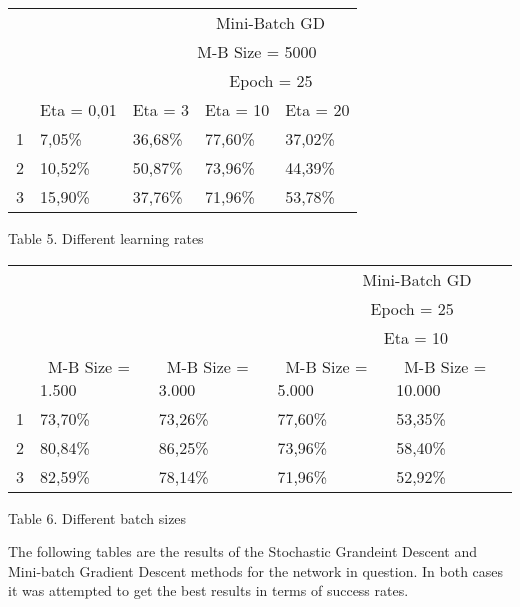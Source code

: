 \documentclass[a4paper, 12pt]{amsart}
\begin{document}
\centering
\begin{tabular}{l|llll}
\multicolumn{5}{l}{~ ~ ~ ~ ~ ~ ~ ~ ~ ~ ~ ~ ~ ~ ~ Mini-Batch GD}    \\
\multicolumn{5}{l}{~ ~ ~ ~ ~ ~ ~ ~ ~ ~ ~ ~ ~ ~M-B Size = 5000}    \\
\multicolumn{5}{l}{~ ~ ~ ~ ~ ~ ~ ~ ~ ~ ~ ~ ~ ~ ~ ~ Epoch = 25}     \\
  & Eta = 0,01 & Eta = 3 & Eta = 10 & Eta = 20                     \\ 
\hline
1 & 7,05\%     & 36,68\% & 77,60\%  & 37,02\%                      \\
2 & 10,52\%    & 50,87\% & 73,96\%  & 44,39\%                      \\
3 & 15,90\%    & 37,76\% & 71,96\%  & 53,78\%                     
\end{tabular}
\begin{center}
Table 5. Different learning rates
\end{center}
\centering
\begin{tabular}{l|llll}
\multicolumn{5}{l}{~ ~ ~ ~ ~ ~ ~ ~ ~ ~ ~ ~ ~ ~ ~ ~ ~ ~ ~ ~ ~ ~ ~ ~ ~ ~ Mini-Batch GD}  \\
\multicolumn{5}{l}{~ ~ ~ ~ ~ ~ ~ ~ ~ ~ ~ ~ ~ ~ ~ ~ ~ ~ ~ ~ ~ ~ ~ ~ ~ ~ ~Epoch = 25}    \\
\multicolumn{5}{l}{~ ~ ~ ~ ~ ~ ~ ~ ~ ~ ~ ~ ~ ~ ~ ~ ~ ~ ~ ~ ~ ~ ~ ~ ~ ~ ~ ~Eta = 10}    \\
  & ~M-B Size = 1.500 & ~M-B Size = 3.000 & ~M-B Size = 5.000 & ~M-B Size = 10.000     \\ 
\hline
1 & 73,70\%      & 73,26\%      & 77,60\%      & 53,35\%                \\
2 & 80,84\%      & 86,25\%      & 73,96\%      & 58,40\%                \\
3 & 82,59\%      & 78,14\%      & 71,96\%      & 52,92\%               
\end{tabular}
\begin{center}
Table 6. Different batch sizes
\end{center}
\justify

The following tables are the results of the Stochastic Grandeint Descent and Mini-batch Gradient Descent methods for the network in question. In both cases it was attempted to get the best results in terms of success rates.
\end{document}
